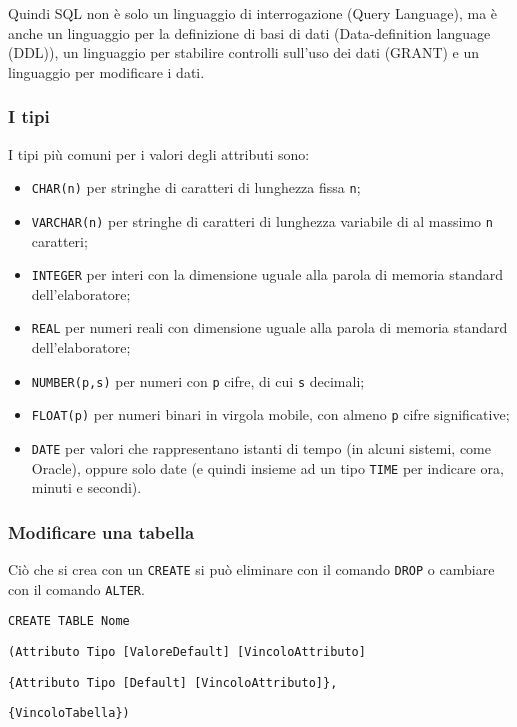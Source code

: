 \noindent Quindi SQL non è solo un linguaggio di interrogazione (Query Language), ma è anche un linguaggio per la definizione di basi di dati (Data-definition language (DDL)), un linguaggio per stabilire controlli sull'uso dei dati (GRANT) e un linguaggio per modificare i dati.

\subsubsection{I tipi}

I tipi più comuni per i valori degli attributi sono:
\begin{itemize}
	\item \texttt{CHAR(n)} per stringhe di caratteri di lunghezza fissa \texttt{n};
	\item \texttt{VARCHAR(n)} per stringhe di caratteri di lunghezza variabile di al massimo \texttt{n} caratteri;
	\item \texttt{INTEGER} per interi con la dimensione uguale alla parola di memoria standard dell'elaboratore;
	\item \texttt{REAL} per numeri reali con dimensione uguale alla parola di memoria standard dell'elaboratore;
	\item \texttt{NUMBER(p,s)} per numeri con \texttt{p} cifre, di cui \texttt{s} decimali;
	\item \texttt{FLOAT(p)} per numeri binari in virgola mobile, con almeno \texttt{p} cifre significative;
	\item \texttt{DATE} per valori che rappresentano istanti di tempo (in alcuni sistemi, come Oracle), oppure solo date (e quindi insieme ad un tipo \texttt{TIME} per indicare ora, minuti e secondi).
\end{itemize}

\subsubsection{Modificare una tabella}

Ciò che si crea con un \texttt{CREATE} si può eliminare con il comando \texttt{DROP} o cambiare con il comando \texttt{ALTER}.
\begin{flushleft}
	\texttt{CREATE TABLE Nome}

	\quad \texttt{(Attributo Tipo [ValoreDefault] [VincoloAttributo]}

	\qquad \texttt{\{Attributo Tipo [Default] [VincoloAttributo]\},}

	\qquad \texttt{\{VincoloTabella\})}

\end{flushleft}

